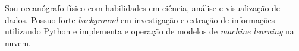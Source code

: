 \documentclass[9pt]{developercv} %
\begin{document}

\begin{minipage}[t]{1\textwidth} %
Sou oceanógrafo físico com habilidades em ciência, análise e visualização de dados. Possuo forte \textit{background} em investigação e extração de informações utilizando Python e implementa e operação de modelos de \textit{machine learning} na nuvem. 
\end{minipage}
\hspace{0.3cm}
\hfill %

\begin{center}
\end{center}

\vspace{-0.2cm}
\end{document}
